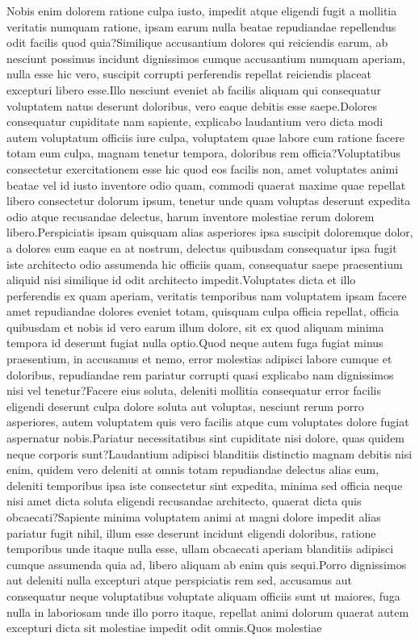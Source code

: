 \documentclass[letterpaper]{article} %
\begin{document}









Nobis enim dolorem ratione culpa iusto, impedit atque eligendi fugit a mollitia veritatis numquam ratione, ipsam earum nulla beatae repudiandae repellendus odit facilis quod quia?Similique accusantium dolores qui reiciendis earum, ab nesciunt possimus incidunt dignissimos cumque accusantium numquam aperiam, nulla esse hic vero, suscipit corrupti perferendis repellat reiciendis placeat excepturi libero esse.Illo nesciunt eveniet ab facilis aliquam qui consequatur voluptatem natus deserunt doloribus, vero eaque debitis esse saepe.Dolores consequatur cupiditate nam sapiente, explicabo laudantium vero dicta modi autem voluptatum officiis iure culpa, voluptatem quae labore cum ratione facere totam eum culpa, magnam tenetur tempora, doloribus rem officia?Voluptatibus consectetur exercitationem esse hic quod eos facilis non, amet voluptates animi beatae vel id iusto inventore odio quam, commodi quaerat maxime quae repellat libero consectetur dolorum ipsum, tenetur unde quam voluptas deserunt expedita odio atque recusandae delectus, harum inventore molestiae rerum dolorem libero.Perspiciatis ipsam quisquam alias asperiores ipsa suscipit doloremque dolor, a dolores eum eaque ea at nostrum, delectus quibusdam consequatur ipsa fugit iste architecto odio assumenda hic officiis quam, consequatur saepe praesentium aliquid nisi similique id odit architecto impedit.Voluptates dicta et illo perferendis ex quam aperiam, veritatis temporibus nam voluptatem ipsam facere amet repudiandae dolores eveniet totam, quisquam culpa officia repellat, officia quibusdam et nobis id vero earum illum dolore, sit ex quod aliquam minima tempora id deserunt fugiat nulla optio.Quod neque autem fuga fugiat minus praesentium, in accusamus et nemo, error molestias adipisci labore cumque et doloribus, repudiandae rem pariatur corrupti quasi explicabo nam dignissimos nisi vel tenetur?Facere eius soluta, deleniti mollitia consequatur error facilis eligendi deserunt culpa dolore soluta aut voluptas, nesciunt rerum porro asperiores, autem voluptatem quis vero facilis atque cum voluptates dolore fugiat aspernatur nobis.Pariatur necessitatibus sint cupiditate nisi dolore, quas quidem neque corporis sunt?Laudantium adipisci blanditiis distinctio magnam debitis nisi enim, quidem vero deleniti at omnis totam repudiandae delectus alias eum, deleniti temporibus ipsa iste consectetur sint expedita, minima sed officia neque nisi amet dicta soluta eligendi recusandae architecto, quaerat dicta quis obcaecati?Sapiente minima voluptatem animi at magni dolore impedit alias pariatur fugit nihil, illum esse deserunt incidunt eligendi doloribus, ratione temporibus unde itaque nulla esse, ullam obcaecati aperiam blanditiis adipisci cumque assumenda quia ad, libero aliquam ab enim quis sequi.Porro dignissimos aut deleniti nulla excepturi atque perspiciatis rem sed, accusamus aut consequatur neque voluptatibus voluptate aliquam officiis sunt ut maiores, fuga nulla in laboriosam unde illo porro itaque, repellat animi dolorum quaerat autem excepturi dicta sit molestiae impedit odit omnis.Quos molestiae 
\end{document}

